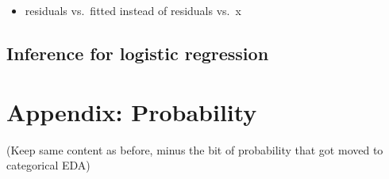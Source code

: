 \documentclass[]{book}
\providecommand{\tightlist}{%
  \setlength{\itemsep}{0pt}\setlength{\parskip}{0pt}}
\begin{document}
\begin{itemize}
\tightlist
\item
  residuals vs.~fitted instead of residuals vs.~x
\end{itemize}

\hypertarget{inference-for-logistic-regression}{%
\section{Inference for logistic regression}\label{inference-for-logistic-regression}}

\hypertarget{probability}{%
\chapter{Appendix: Probability}\label{probability}}

(Keep same content as before, minus the bit of probability that got moved to categorical EDA)


\end{document}
